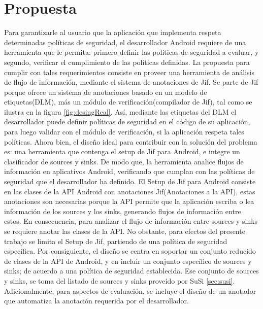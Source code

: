 \section{Propuesta}
Para garantizarle al usuario que la aplicación que implementa respeta
determinadas políticas de seguridad, el desarrollador Android requiere de una
herramienta que le permita: primero definir las políticas de seguridad a
evaluar, y segundo, verificar el cumplimiento de las políticas
definidas.\newline 
La propuesta para cumplir con tales requerimientos consiste en proveer una
herramienta de análisis de flujo de información, mediante el sistema de
anotaciones de Jif. Se parte de Jif porque ofrece un sistema de anotaciones
basado en un modelo de etiquetas(DLM), más un módulo de verificación(compilador
de Jif), tal como se ilustra en la figura \ref{fig:desingReal}. 
Así, mediante las etiquetas del DLM el desarrollador puede definir políticas de
seguridad en el código de su aplicación, para luego validar con el módulo de
verificación, si la aplicación respeta tales políticas.\newline 
Ahora bien, el diseño ideal para contribuir con la solución del problema es: una
herramienta que contenga el setup de Jif para Android, e integre un clasificador de sources
y sinks. De modo que, la herramienta analice flujos de información en
aplicativos Android, verificando que cumplan con las políticas de seguridad que
el desarrollador ha definido.\newline 
El Setup de Jif para Android consiste en las clases de la API Android con
anotaciones Jif(Anotaciones a la API), estas
anotaciones son necesarias porque la API permite que la aplicación escriba o lea
información de los sources y los sinks, generando flujos de información entre
estos. En consecuencia, para analizar el flujo de información entre sources y
sinks se requiere anotar las clases de la API.\newline
No obstante, para efectos del presente trabajo se limita el Setup de Jif,
partiendo de una política de seguridad específica.
Por consiguiente, el diseño se centra en soportar un conjunto reducido de clases
de la API de Android, y en incluir un conjunto específico de sources y
sinks; de acuerdo a una política de seguridad establecida. Ese conjunto de
sources y sinks, se toma del listado de sources y sinks proveído por SuSi
\ref{sec:susi}.\newline
Adicionalmente, para aspectos de evaluación, se incluye el diseño de un anotador
que automatiza la anotación requerida por el desarrollador.
